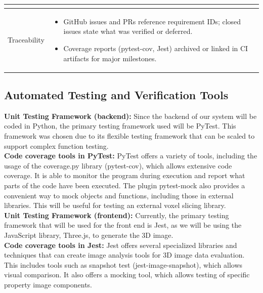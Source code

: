 \documentclass[12pt, titlepage]{article}
\begin{document}
\begin{table}[H]
\begin{tabular}{|p{}|p{}|}
\begin{itemize}
\end{itemize} \\ \hline
Traceability &
\begin{itemize}
\item GitHub issues and PRs reference requirement IDs; closed issues state what was verified or deferred.
\item Coverage reports (pytest-cov, Jest) archived or linked in CI artifacts for major milestones.
\end{itemize} \\ \hline
\end{tabular}
\end{table}


\subsection{Automated Testing and Verification Tools}

\noindent\textbf{Unit Testing Framework (backend):} Since the backend of our system will be coded in Python, the primary testing framework used will be PyTest. This framework was chosen due to its flexible testing framework that can be scaled to support complex function testing. \\

\noindent\textbf{Code coverage tools  in PyTest:} PyTest offers a variety of tools, including the usage of the coverage.py library (pytest-cov), which allows extensive code coverage. It is able to monitor the program during execution and report what parts of the code have been executed. The plugin pytest-mock also provides a convenient way to mock objects and functions, including those in external libraries. This will be useful for testing an external voxel slicing library.\\

\noindent\textbf{Unit Testing Framework (frontend):} Currently, the primary testing framework that will be used for the front end is Jest, as we will be using the JavaScript library, Three.js, to generate the 3D image.\\

\noindent\textbf{Code coverage tools in Jest:} Jest offers several specialized libraries and techniques that can create image analysis tools for 3D image data evaluation. This includes tools such as snapshot test (jest-image-snapshot), which allows visual comparison. It also offers a mocking tool, which allows testing of specific property image components.\\
\end{document}
